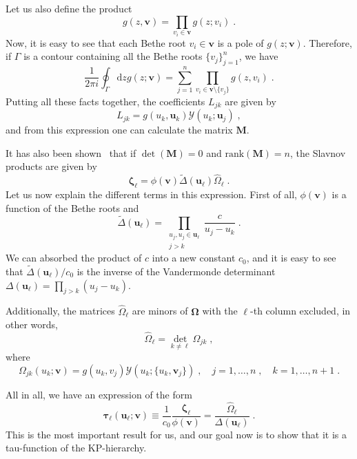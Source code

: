 \documentclass[a4paper,12pt]{amsart}
\begin{document}
Let us also define the product 
\begin{equation}
  g(z, \bm{v}) = \prod_{v_i\in \bm{v}} g(z; v_i)\; . 
\end{equation}
Now, it is easy to see that each Bethe root \( v_i \in \bm{v}\) is a
pole of \(g(z;\bm{v})\). Therefore, if \(\Gamma\) is a contour
containing all the Bethe roots \(\{v_j\}_{j=1}^n\), we have
\begin{equation}
  \frac{1}{2 \pi i}\oint_{\Gamma} \mathrm{d}z g(z; \bm{v}) = \sum_{j=1}^n
  \prod_{v_i \in \bm{v}\setminus \{v_j\}} g(z, v_i)\; .
\end{equation}
Putting all these facts together, the coefficients \(L_{jk}\) are given by
\begin{equation}
  L_{jk} = g(u_k, \bm{u}_k) \mathcal{Y}(u_k; \bm{u}_j)\; ,
\end{equation}
and from this expression one can calculate the matrix \(\bm{M}\).

It has also been shown~\cite{Belliard:2019bfz} that if \(\det (\bm{M})
= 0 \) and \(\mathrm{rank}(\bm{M}) = n\), the Slavnov products are
given by
\begin{equation}
 \bm{\zeta}_\ell = \phi(\bm{v}) \tilde{\Delta}(\bm{u}_\ell)\hat{\Omega}_\ell\; . 
\end{equation}
Let us now explain the different terms in this expression. 
First of all, \(\phi(\bm{v})\) is a function of the Bethe roots and
\begin{equation}
  \tilde{\Delta}(\bm{u}_\ell) = \prod_{\substack{u_j, u_j \in \bm{u}_\ell \\ j>k}} \frac{c}{u_j - u_k}\; .
\end{equation}
We can absorbed the product of \(c\) into a new constant
\(c_0\), and it is easy to see that \(\tilde{\Delta}(\bm{u}_\ell)/c_0\) is the
inverse of the Vandermonde determinant \(\Delta(\bm{u}_\ell) =
\prod_{j>k}(u_j - u_k)\).

Additionally, the matrices \(\hat{\Omega}_\ell\) are minors of
\(\bm{\Omega}\) with the \(\ell\)-th column excluded, in other words,
\begin{equation}
 \hat{\Omega}_\ell = \det_{k\neq \ell} \Omega_{jk}\; ,
\end{equation}
where
\begin{equation}
  \Omega_{jk}(u_k; \bm{v}) = g(u_k, v_j) \mathcal{Y}(u_k; \{u_k, \bm{v}_j\})\; ,
  \quad j= 1, \dots, n\; , \quad k =1, \dots, n+1\; .
\end{equation}

All in all, we have an expression of the form
\begin{equation}
  \label{eq:slavnov-tau}
  \bm{\tau}_\ell(\bm{u}_\ell; \bm{v}) \equiv \frac{1}{c_0}\frac{\bm{\zeta}_\ell}{\phi(\bm{v})}
  = \frac{\hat{\Omega}_{\ell}}{\Delta(\bm{u}_\ell)} \; .
\end{equation}
This is the most important result for us, and our goal now is to show
that it is a tau-function of the KP-hierarchy.
\end{document}
